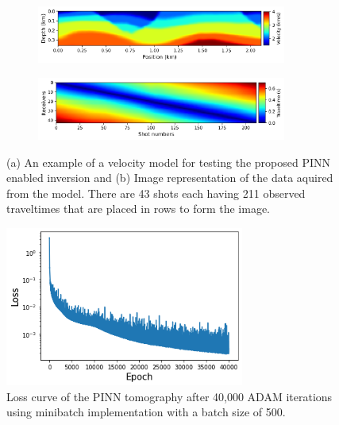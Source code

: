 \begin{figure}
       \centering
       \begin{subfigure}[b]{.9\textwidth}
               \centering
               \includegraphics[width=0.9\textwidth]{figures/chap03_pinn_enabled/thesis_model2} 
               \caption{}
               \label{fig:thesis_model2}
       \end{subfigure}
       \begin{subfigure}[b]{.9\textwidth}
               \centering
               \includegraphics[width=0.9\textwidth]{figures/chap03_pinn_enabled/thesis_model2_data}
               \caption{}
               \label{fig:thesis_model2_data}
       \end{subfigure}
       \caption{(a) An example of a velocity model for testing the proposed PINN enabled inversion and (b) Image representation of the data aquired from the model. There are 43 shots each having 211 observed traveltimes that are placed in rows to form the image.  }
       \label{fig:model2}
\end{figure}

\begin{figure}
 \centering
 \includegraphics[width=0.7\textwidth]{figures/chap03_pinn_enabled/thesis_model2_loss} 
 \caption{Loss curve of the PINN tomography after 40,000 ADAM iterations using minibatch implementation with a batch size of 500.}
 \label{fig:thesis_model2_loss}
\end{figure}

